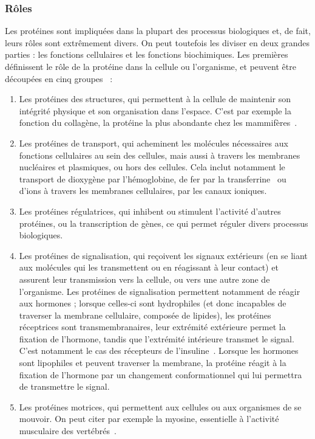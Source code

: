	\subsubsection{Rôles}
	Les protéines sont impliquées dans la plupart des processus biologiques et, de fait, leurs rôles sont extrêmement divers. On peut toutefois les diviser en deux grandes parties : les fonctions cellulaires et les fonctions biochimiques. Les premières définissent le rôle de la protéine dans la cellule ou l'organisme, et peuvent être découpées en cinq groupes~\cite{lodish1995molecular} :
	\begin{enumerate}
		\item Les protéines des structures, qui permettent à la cellule de maintenir son intégrité physique et son organisation dans l'espace. C'est par exemple la fonction du collagène, la protéine la plus abondante chez les mammifères~\cite{di2002mapping}.
		\item Les protéines de transport, qui acheminent les molécules nécessaires aux fonctions cellulaires au sein des cellules, mais aussi à travers les membranes nucléaires et plasmiques, ou hors des cellules. Cela inclut notamment le transport de dioxygène par l'hémoglobine, de fer par la transferrine~\cite{crichton1987iron} ou d'ions à travers les membranes cellulaires, par les canaux ioniques. 
		\item Les protéines régulatrices, qui inhibent ou stimulent l'activité d'autres protéines, ou la transcription de gènes, ce qui permet réguler divers processus biologiques.
		\item Les protéines de signalisation, qui reçoivent les signaux extérieurs (en se liant aux molécules qui les transmettent ou en réagissant à leur contact) et assurent leur transmission vers la cellule, ou vers une autre zone de l'organisme. Les protéines de signalisation permettent notamment de réagir aux hormones ; lorsque celles-ci sont hydrophiles (et donc incapables de traverser la membrane cellulaire, composée de lipides), les protéines réceptrices sont transmembranaires, leur extrémité extérieure permet la fixation de l'hormone, tandis que l'extrémité intérieure transmet le signal. C'est notamment le cas des récepteurs de l'insuline~\cite{gammeltoft1984insulin}. Lorsque les hormones sont lipophiles et peuvent traverser la membrane, la protéine réagit à la fixation de l'hormone par un changement conformationnel qui lui permettra de transmettre le signal. 
		\item Les protéines motrices, qui permettent aux cellules ou aux organismes de se mouvoir. On peut citer par exemple la myosine, essentielle à l'activité musculaire des vertébrés~\cite{pollard1973acanthamoeba}.
	\end{enumerate}	

